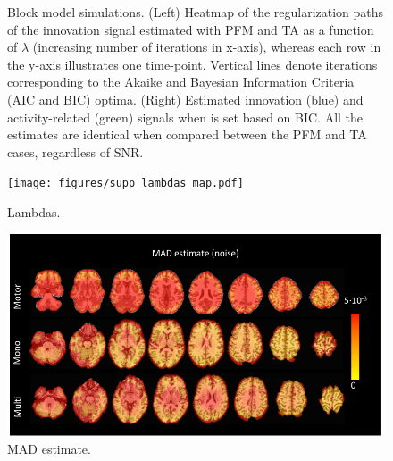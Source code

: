 \begin{figure}[h!]
\begin{center}
    \end{center}
    \caption{Block model simulations. (Left) Heatmap of the regularization paths of the innovation signal estimated with PFM and TA as a function of \(\lambda\) (increasing number of iterations in x-axis), whereas each row in the y-axis illustrates one time-point. Vertical lines denote iterations corresponding to the Akaike and Bayesian Information Criteria (AIC and BIC) optima. (Right) Estimated innovation (blue) and activity-related (green) signals when is set based on BIC. All the estimates are identical when compared between the PFM and TA cases, regardless of SNR.}
\label{fig:path_block}
\end{figure}


\begin{figure}[h!]
    \begin{center}
        \texttt{[image: figures/supp\_lambdas\_map.pdf]}
    \end{center}
    \caption{Lambdas.}
\label{fig:lambdas}
\end{figure}

\begin{figure}[h!]
    \begin{center}
        \includegraphics[width=\textwidth]{figures/supp_mad_estimate.pdf}
    \end{center}
    \caption{MAD estimate.}
\label{fig:mad_estimate}
\end{figure}

